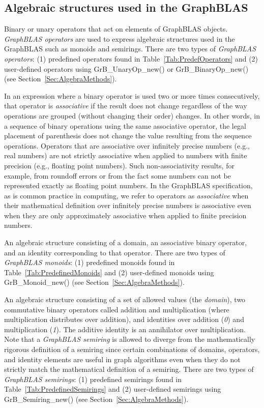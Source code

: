 \subsection{Algebraic structures used in the GraphBLAS}

\glossBegin
{} Binary or unary operators that act on elements of GraphBLAS 
objects.  \emph{GraphBLAS operators} are used to express algebraic structures used in the 
GraphBLAS such as monoids and semirings. There are two types of \emph{GraphBLAS operators}: 
(1) predefined operators found in Table~\ref{Tab:PredefOperators} and (2) user-defined 
operators using {\sf GrB\_UnaryOp\_new()} or {\sf GrB\_BinaryOp\_new()} 
(see Section~\ref{Sec:AlgebraMethods}).

 In an expression where a binary operator is used 
two or more times consecutively, that operator is \emph{associative} if the result 
does not change regardless of the way operations are grouped (without changing their order) 
changes. In other words, in a sequence of binary operations using the same associative 
operator, the legal placement of parenthesis does not change the value resulting 
from the sequence operations.  Operators that are associative over infinitely 
precise numbers (e.g., real numbers) are not strictly associative when applied to 
numbers with finite precision (e.g., floating point numbers). Such non-associativity 
results, for example, from roundoff errors or from the fact some numbers can not 
be represented exactly as floating point numbers.   In the GraphBLAS specification, 
as is common practice in computing, we refer to operators as \emph{associative} 
when their mathematical definition over infinitely precise numbers is associative 
even when they are only approximately associative when applied to finite precision 
numbers.

 An algebraic structure consisting of a domain, an associative 
binary operator, and an identity corresponding to that operator.  There are two types 
of \emph{GraphBLAS monoids}: (1) predefined monoids found in 
Table~\ref{Tab:PredefinedMonoids} and (2) user-defined monoids using 
{\sf GrB\_Monoid\_new()} (see Section~\ref{Sec:AlgebraMethods}). 

 An algebraic structure consisting of a set of allowed values
(the \emph{domain}), two commutative binary operators called addition 
and multiplication (where multiplication distributes over addition),
and identities over addition (\emph{0}) and multiplication (\emph{1}).  The additive
identity is an annihilator over multiplication.   
Note that a \emph{GraphBLAS semiring} is allowed to diverge from the mathematically 
rigorous definition of a semiring since certain combinations of domains, operators, and identity 
elements are useful in graph algorithms even when they do not strictly match the mathematical
definition of a semiring.
There are two types 
of \emph{GraphBLAS semirings}: (1) predefined semirings found in 
Table~\ref{Tab:PredefinedSemirings} and (2) user-defined semirings using 
{\sf GrB\_Semiring\_new()} (see Section~\ref{Sec:AlgebraMethods}). 
\glossEnd



